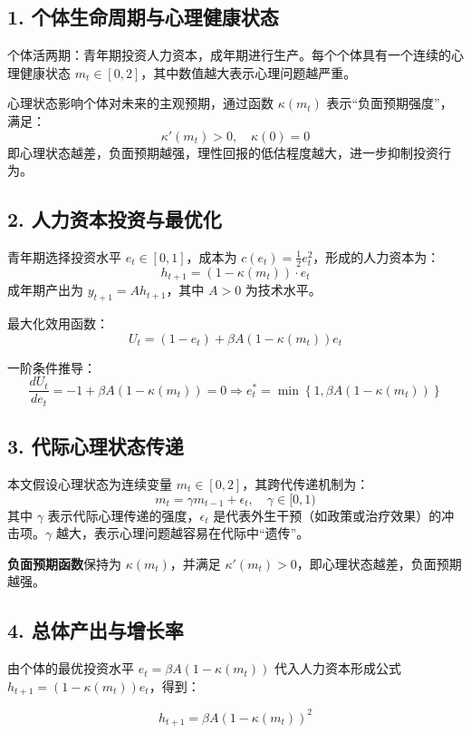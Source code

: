 \documentclass[12pt]{article}
\begin{document}
\subsection*{1. 个体生命周期与心理健康状态}

个体活两期：青年期投资人力资本，成年期进行生产。每个个体具有一个连续的心理健康状态 $m_t \in [0,2]$，其中数值越大表示心理问题越严重。

心理状态影响个体对未来的主观预期，通过函数 $\kappa(m_t)$ 表示“负面预期强度”，满足：
\[
\kappa'(m_t) > 0,\quad \kappa(0) = 0
\]
即心理状态越差，负面预期越强，理性回报的低估程度越大，进一步抑制投资行为。

\subsection*{2. 人力资本投资与最优化}

青年期选择投资水平 $e_t \in [0,1]$，成本为 $c(e_t) = \frac{1}{2} e_t^2$，形成的人力资本为：
\[
h_{t+1} = (1 - \kappa(m_t)) \cdot e_t
\]
成年期产出为 $y_{t+1} = A h_{t+1}$，其中 $A > 0$ 为技术水平。

最大化效用函数：
\[
U_t = (1 - e_t) + \beta A (1 - \kappa(m_t)) e_t
\]

一阶条件推导：
\[
\frac{dU_t}{de_t} = -1 + \beta A (1 - \kappa(m_t)) = 0 \Rightarrow e_t^* = \min \left\{1, \beta A (1 - \kappa(m_t)) \right\}
\]

\subsection*{3. 代际心理状态传递}

本文假设心理状态为连续变量 $m_t \in [0,2]$，其跨代传递机制为：
\[
m_t = \gamma m_{t-1} + \epsilon_t, \quad \gamma \in [0,1)
\]
其中 $\gamma$ 表示代际心理传递的强度，$\epsilon_t$ 是代表外生干预（如政策或治疗效果）的冲击项。$\gamma$ 越大，表示心理问题越容易在代际中“遗传”。

\textbf{负面预期函数}保持为 $\kappa(m_t)$，并满足 $\kappa'(m_t) > 0$，即心理状态越差，负面预期越强。


\subsection*{4. 总体产出与增长率}

由个体的最优投资水平 $e_t = \beta A (1 - \kappa(m_t))$ 代入人力资本形成公式 $h_{t+1} = (1 - \kappa(m_t)) e_t$，得到：

\[
h_{t+1} = \beta A (1 - \kappa(m_t))^2
\]
\end{document}
